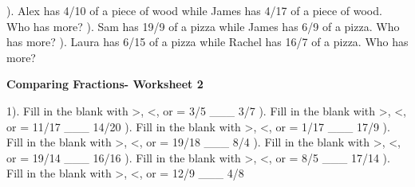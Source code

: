 \documentclass{article}%
\begin{document}
\newline%
\newline%
). Alex has 4/10 of a piece of wood while James has 4/17 of a piece of wood. Who has more?%
\newline%
\newline%
). Sam has 19/9 of a pizza while James has 6/9 of a pizza. Who has more?%
\newline%
\newline%
). Laura has 6/15 of a pizza while Rachel has 16/7 of a pizza. Who has more?%
\newline%
\newline%
\newline%
\pagebreak%
\large%
\begin{center}%
\textbf{Comparing Fractions- Worksheet 2}%
\newline%
\newline%
\newline%
\end{center} \normalsize%
1). Fill in the blank with >, <, or = 3/5 \_\_\_ 3/7%
\newline%
\newline%
). Fill in the blank with >, <, or = 11/17 \_\_\_ 14/20%
\newline%
\newline%
). Fill in the blank with >, <, or = 1/17 \_\_\_ 17/9%
\newline%
\newline%
). Fill in the blank with >, <, or = 19/18 \_\_\_ 8/4%
\newline%
\newline%
). Fill in the blank with >, <, or = 19/14 \_\_\_ 16/16%
\newline%
\newline%
). Fill in the blank with >, <, or = 8/5 \_\_\_ 17/14%
\newline%
\newline%
). Fill in the blank with >, <, or = 12/9 \_\_\_ 4/8%
\newline%
\newline%
\newline%
\end{document}
